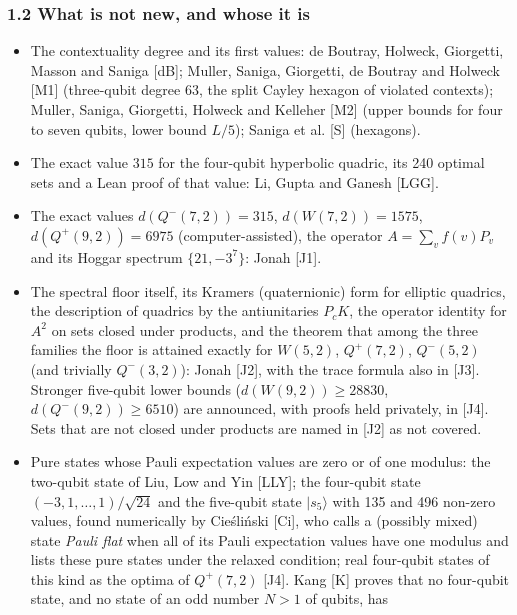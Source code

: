 \documentclass[11pt,a4paper]{article}
\providecommand{\tightlist}{\setlength{\itemsep}{0pt}\setlength{\parskip}{0pt}}
\newcommand{\gt}{>}
\begin{document}
\subsubsection{1.2 What is not new, and whose it is}\label{12-what-is-not-new-and-whose-it-is}

\begin{itemize}
\tightlist
\item
  The contextuality degree and its first values: de Boutray, Holweck, Giorgetti, Masson and Saniga
  {[}dB{]}; Muller, Saniga, Giorgetti, de Boutray and Holweck {[}M1{]} (three-qubit degree 63, the split Cayley
  hexagon of violated contexts); Muller, Saniga, Giorgetti, Holweck and Kelleher {[}M2{]} (upper bounds
  for four to seven qubits, lower bound \(L/5\)); Saniga et al. {[}S{]} (hexagons).
\item
  The exact value \(315\) for the four-qubit hyperbolic quadric, its 240 optimal sets and a Lean proof of
  that value: Li, Gupta and Ganesh {[}LGG{]}.
\item
  The exact values \(d(Q^-(7,2)) = 315\), \(d(W(7,2)) = 1575\), \(d(Q^+(9,2)) = 6975\) (computer-assisted),
  the operator \(A = \sum_v f(v) P_v\) and its Hoggar spectrum \(\{21, -3^7\}\): Jonah {[}J1{]}.
\item
  The spectral floor itself, its Kramers (quaternionic) form for elliptic quadrics, the description of
  quadrics by the antiunitaries \(P_c K\), the operator identity for \(A^2\) on sets closed under products,
  and the theorem that among the three families the floor is attained exactly for
  \(W(5,2)\), \(Q^+(7,2)\), \(Q^-(5,2)\) (and trivially \(Q^-(3,2)\)): Jonah {[}J2{]}, with the trace formula also
  in {[}J3{]}. Stronger five-qubit lower bounds (\(d(W(9,2)) \ge 28830\), \(d(Q^-(9,2)) \ge 6510\)) are
  announced, with proofs held privately, in {[}J4{]}. Sets that are not closed under products are named in
  {[}J2{]} as not covered.
\item
  Pure states whose Pauli expectation values are zero or of one modulus: the two-qubit state of Liu, Low
  and Yin {[}LLY{]}; the four-qubit state \((-3,1,\dots,1)/\sqrt{24}\) and the five-qubit state \(|s_5\rangle\)
  with 135 and 496 non-zero values, found numerically by Cieśliński {[}Ci{]}, who calls a (possibly mixed)
  state \emph{Pauli flat} when all of its Pauli expectation values have one modulus and lists these pure
  states under the relaxed condition; real four-qubit states of this kind as the optima of \(Q^+(7,2)\)
  {[}J4{]}. Kang {[}K{]} proves that no four-qubit state, and no state of an odd number \(N \gt 1\) of qubits, has

\end{itemize}
\end{document}
